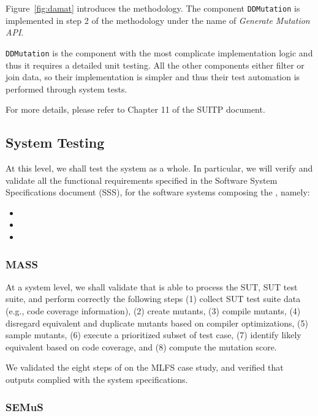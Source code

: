Figure~\ref{fig:damat} introduces the \DAMA methodology. The component \texttt{DDMutation} is implemented in step 2 of the methodology under the name of \emph{Generate Mutation API}.

\texttt{DDMutation} is the component with the most complicate implementation logic and thus it requires a detailed unit testing. All the other components either filter or join data, so their implementation is simpler and thus their test automation is performed through system tests.

For more details, please refer to Chapter 11 of the SUITP document.

\subsection{System Testing}

At this level, we shall test the system as a whole. In particular, we will verify and validate all the functional requirements specified in the Software System Specifications document (SSS), for the software systems composing the \FAQAS, namely:
\begin{itemize}
  \item \MASS
  \item \DAMA
  \item \SEMUS
\end{itemize}

\subsubsection{MASS}

At a system level, we shall validate that \MASS is able to process the SUT, SUT test suite, and perform correctly the following steps (1) collect SUT test suite data (e.g., code coverage information), (2) create mutants, (3) compile mutants, (4) disregard equivalent and duplicate mutants based on compiler optimizations, (5) sample mutants, (6) execute a prioritized subset of test case, (7) identify likely equivalent based on code coverage, and (8) compute the mutation score.

We validated the eight steps of \MASS on the MLFS case study, and verified that outputs complied with the system specifications.



\subsubsection{SEMuS}

